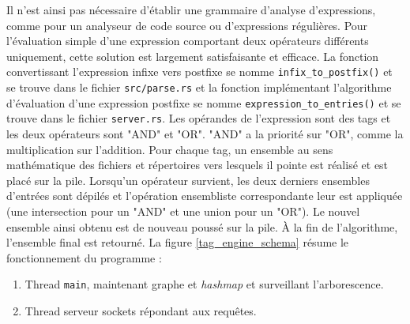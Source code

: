 \bigbreak
Il n'est ainsi pas nécessaire d'établir une grammaire d'analyse d'expressions, comme pour un 
analyseur de code source ou d'expressions 
régulières. Pour l'évaluation simple d'une expression comportant deux opérateurs différents uniquement, 
cette solution est largement satisfaisante et efficace. La fonction convertissant l'expression 
infixe vers postfixe se nomme \texttt{infix_to_postfix()} et se trouve dans le fichier 
\texttt{src/parse.rs} et la fonction implémentant l'algorithme d'évaluation d'une 
expression postfixe se nomme \texttt{expression_to_entries()} et se trouve dans le fichier 
\texttt{server.rs}. Les opérandes de l'expression sont des tags et les deux opérateurs sont 
"AND" et "OR". "AND" a la priorité sur "OR", comme la multiplication sur l'addition. Pour chaque tag, 
un ensemble au sens mathématique des fichiers et répertoires vers lesquels il pointe est réalisé et 
est placé sur la pile. Lorsqu'un opérateur survient, les deux derniers ensembles d'entrées sont 
dépilés et l'opération ensembliste correspondante leur est appliquée (une intersection pour un "AND" 
et une union pour un "OR"). Le nouvel ensemble ainsi obtenu est de nouveau poussé sur la pile. 
À la fin de l'algorithme, l'ensemble final est retourné. La figure \ref{tag_engine_schema} résume 
le fonctionnement du programme : 
\begin{enumerate}
    \item Thread \texttt{main}, maintenant graphe et \textit{hashmap} et surveillant l'arborescence.
    \item Thread serveur sockets répondant aux requêtes.
\end{enumerate}
